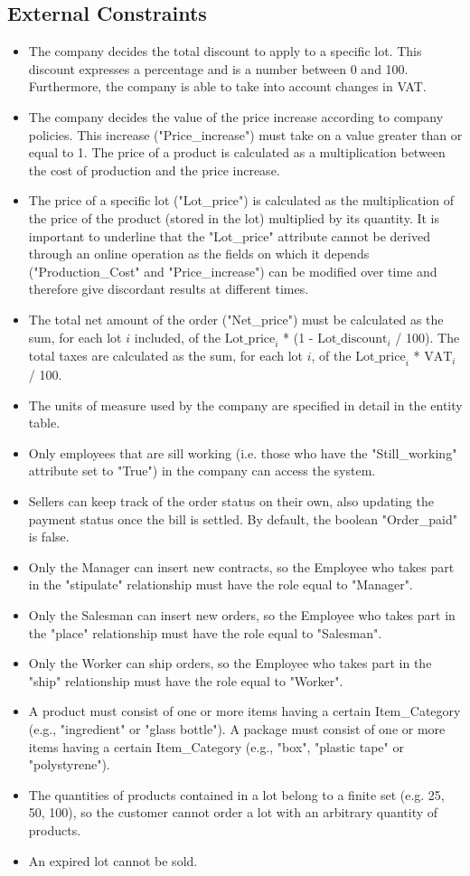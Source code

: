 \subsection{External Constraints}
\begin{itemize}
\item The company decides the total discount to apply to a specific lot. This discount expresses a percentage and is a number between 0 and 100. Furthermore, the company is able to take into account changes in VAT.
\item The company decides the value of the price increase according to company policies. This increase ("Price\_increase") must take on a value greater than or equal to 1. The price of a product is calculated as a multiplication between the cost of production and the price increase.
\item The price of a specific lot ("Lot\_price") is calculated as the multiplication of the price of the product (stored in the lot) multiplied by its quantity. It is important to underline that the "Lot\_price" attribute cannot be derived through an online operation as the fields on which it depends ("Production\_Cost" and "Price\_increase") can be modified over time and therefore give discordant results at different times.
\item The total net amount of the order ("Net\_price") must be calculated as the sum, for each lot $i$ included, of the $ \mathrm{Lot\_price}_i $ * (1 - $ \mathrm{Lot\_discount}_i $ / 100). The total taxes are calculated as the sum, for each lot $i$, of the $ \mathrm{Lot\_price}_i $ * $ \mathrm{VAT}_i $ / 100.
\item The units of measure used by the company are specified in detail in the entity table.
\item Only employees that are sill working (i.e. those who have the "Still\_working" attribute set to "True") in the company can access the system.
\item Sellers can keep track of the order status on their own, also updating the payment status once the bill is settled. By default, the boolean "Order\_paid" is false. 
\item Only the Manager can insert new contracts, so the Employee who takes part in the "stipulate" relationship must have the role equal to "Manager". 
\item Only the Salesman can insert new orders, so the Employee who takes part in the "place" relationship must have the role equal to "Salesman". 
\item Only the Worker can ship orders, so the Employee who takes part in the "ship" relationship must have the role equal to "Worker".
\item A product must consist of one or more items having a certain Item\_Category (e.g., "ingredient" or "glass bottle"). A package must consist of one or more items having a certain Item\_Category (e.g., "box", "plastic tape" or "polystyrene"). 
\item The quantities of products contained in a lot belong to a finite set (e.g. 25, 50, 100), so the customer cannot order a lot with an arbitrary quantity of products.
\item An expired lot cannot be sold.
\end{itemize}
